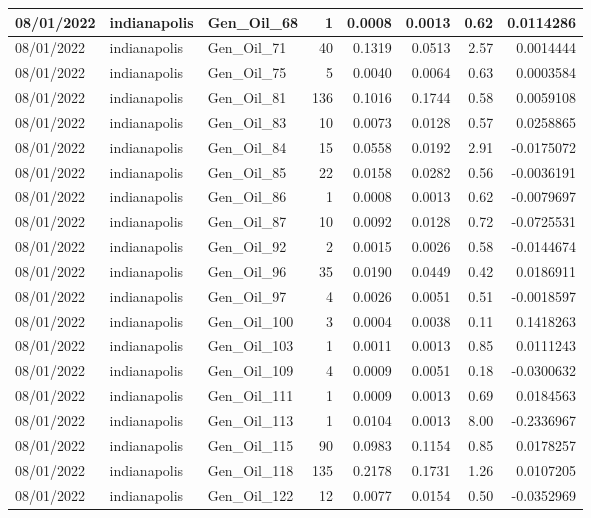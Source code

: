 \documentclass[
  letterpaper,
  DIV=11,
  numbers=noendperiod]{scrartcl}
\begin{document}
\begin{tabular}{l|l|l|r|r|r|r|r}
\hline
08/01/2022 & indianapolis & Gen\_Oil\_68 & 1 & 0.0008 & 0.0013 & 0.62 & 0.0114286\\
\hline
08/01/2022 & indianapolis & Gen\_Oil\_71 & 40 & 0.1319 & 0.0513 & 2.57 & 0.0014444\\
\hline
08/01/2022 & indianapolis & Gen\_Oil\_75 & 5 & 0.0040 & 0.0064 & 0.63 & 0.0003584\\
\hline
08/01/2022 & indianapolis & Gen\_Oil\_81 & 136 & 0.1016 & 0.1744 & 0.58 & 0.0059108\\
\hline
08/01/2022 & indianapolis & Gen\_Oil\_83 & 10 & 0.0073 & 0.0128 & 0.57 & 0.0258865\\
\hline
08/01/2022 & indianapolis & Gen\_Oil\_84 & 15 & 0.0558 & 0.0192 & 2.91 & -0.0175072\\
\hline
08/01/2022 & indianapolis & Gen\_Oil\_85 & 22 & 0.0158 & 0.0282 & 0.56 & -0.0036191\\
\hline
08/01/2022 & indianapolis & Gen\_Oil\_86 & 1 & 0.0008 & 0.0013 & 0.62 & -0.0079697\\
\hline
08/01/2022 & indianapolis & Gen\_Oil\_87 & 10 & 0.0092 & 0.0128 & 0.72 & -0.0725531\\
\hline
08/01/2022 & indianapolis & Gen\_Oil\_92 & 2 & 0.0015 & 0.0026 & 0.58 & -0.0144674\\
\hline
08/01/2022 & indianapolis & Gen\_Oil\_96 & 35 & 0.0190 & 0.0449 & 0.42 & 0.0186911\\
\hline
08/01/2022 & indianapolis & Gen\_Oil\_97 & 4 & 0.0026 & 0.0051 & 0.51 & -0.0018597\\
\hline
08/01/2022 & indianapolis & Gen\_Oil\_100 & 3 & 0.0004 & 0.0038 & 0.11 & 0.1418263\\
\hline
08/01/2022 & indianapolis & Gen\_Oil\_103 & 1 & 0.0011 & 0.0013 & 0.85 & 0.0111243\\
\hline
08/01/2022 & indianapolis & Gen\_Oil\_109 & 4 & 0.0009 & 0.0051 & 0.18 & -0.0300632\\
\hline
08/01/2022 & indianapolis & Gen\_Oil\_111 & 1 & 0.0009 & 0.0013 & 0.69 & 0.0184563\\
\hline
08/01/2022 & indianapolis & Gen\_Oil\_113 & 1 & 0.0104 & 0.0013 & 8.00 & -0.2336967\\
\hline
08/01/2022 & indianapolis & Gen\_Oil\_115 & 90 & 0.0983 & 0.1154 & 0.85 & 0.0178257\\
\hline
08/01/2022 & indianapolis & Gen\_Oil\_118 & 135 & 0.2178 & 0.1731 & 1.26 & 0.0107205\\
\hline
08/01/2022 & indianapolis & Gen\_Oil\_122 & 12 & 0.0077 & 0.0154 & 0.50 & -0.0352969\\

\end{tabular}
\end{document}
